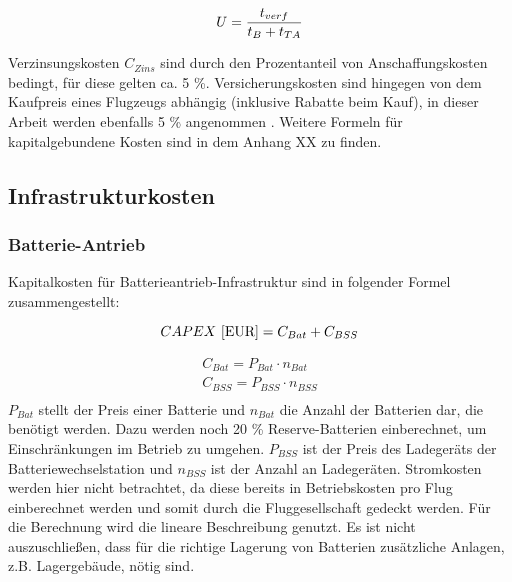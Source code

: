 \begin{equation}
   U = \frac{t_{verf}}{t_B + t_{TA}} \\
   \label{utilisation}
\end{equation}

Verzinsungskosten $C_{Zins}$ sind durch den Prozentanteil von Anschaffungskosten bedingt, für diese gelten ca. 5 \%. 
Versicherungskosten sind hingegen von dem Kaufpreis eines Flugzeugs abhängig (inklusive Rabatte beim Kauf), 
in dieser Arbeit werden ebenfalls 5 \% angenommen \cite{scholz_design_evaluation_doc}. 
Weitere Formeln für kapitalgebundene Kosten sind in dem Anhang XX zu finden. %
%
\subsection{Infrastrukturkosten}

\subsubsection{Batterie-Antrieb}
Kapitalkosten für Batterieantrieb-Infrastruktur sind in folgender Formel zusammengestellt:

\begin{equation}
     {CAPEX ~[\text{EUR}]} = C_{Bat} + C_{BSS} \\ %
     \label{BA_Infrastruktur}
  \end{equation}

\begin{equation}
   \begin{split}
  {C_{Bat}} = P_{Bat} \cdot n_{Bat}  \\
  {C_{BSS}} = P_{BSS} \cdot n_{BSS} \\
  \label{BA}
   \end{split}
  \end{equation}
%
$P_{Bat}$ stellt der Preis einer Batterie und $n_{Bat}$ die Anzahl der Batterien dar, die benötigt werden. 
Dazu werden noch 20 \% Reserve-Batterien einberechnet, um Einschränkungen im Betrieb zu umgehen. 
$P_{BSS}$ ist der Preis des Ladegeräts der Batteriewechselstation und $n_{BSS}$ ist der Anzahl an Ladegeräten. 
Stromkosten werden hier nicht betrachtet, da diese bereits in Betriebskosten 
pro Flug einberechnet werden und somit durch die Fluggesellschaft gedeckt werden. 
Für die Berechnung wird die lineare Beschreibung genutzt. 
Es ist nicht auszuschließen, dass für die richtige Lagerung 
von Batterien zusätzliche Anlagen, z.B. Lagergebäude, nötig sind.
  

